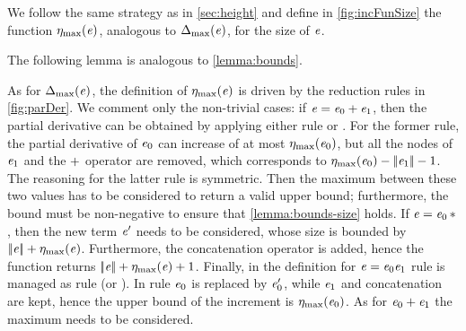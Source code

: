 
We follow the same strategy as in \cref{sec:height} and define in \cref{fig:incFunSize} the function ${\eta_{\max}}({\mathit {e}})$, analogous to ${\Delta_{\max}}({\mathit {e}})$, for the size of $\mathit {e}$.

The following lemma is analogous to \cref{lemma:bounds}.

As for ${\Delta_{\max}}({\mathit {e}})$, the definition of ${\eta_{\max}}({\mathit {e}})$ is driven by the reduction rules in \cref{fig:parDer}. We comment only the non-trivial cases: if $\mathit {e}=\mathit {e}_0\mathbin{+}\mathit {e}_1$, then the partial derivative can be obtained
by applying either rule  or . For the former rule,
the partial derivative of $\mathit {e}_0$ can increase of at most ${\eta_{\max}}({\mathit {e}_0})$, but all the nodes of $\mathit {e}_1$ and the $\mathbin{+}$ operator are removed, which corresponds to ${\eta_{\max}}({\mathit {e}_0})-{{\mid\!\mid}}{\mathit {e}_1}{{\mid\!\mid}}-1$. The reasoning for the latter rule is symmetric. Then the maximum between these two values has to be considered to return a valid upper bound; furthermore, the bound must be non-negative to ensure that \cref{lemma:bounds-size} holds.
If $\mathit {e}={{\mathit {e}_0}\mathop{*}}$, then the new term $\mathit {e}'$ needs to be considered, whose size is bounded by ${{\mid\!\mid}}{\mathit {e}}{{\mid\!\mid}}+{\eta_{\max}}({\mathit {e}})$. Furthermore, the concatenation operator is added, hence the function returns ${{\mid\!\mid}}{\mathit {e}}{{\mid\!\mid}}+{\eta_{\max}}({\mathit {e}})+1$. Finally, in the definition for $\mathit {e}=\mathit {e}_0\mathit {e}_1$ rule  is managed as rule  (or ).
In rule  $\mathit {e}_0$ is replaced by $\mathit {e}_0'$, while $\mathit {e}_1$ and concatenation are kept, hence the upper bound of the increment is ${\eta_{\max}}({\mathit {e}_0})$. As for $\mathit {e}_0\mathbin{+}\mathit {e}_1$ the maximum needs to be considered.

